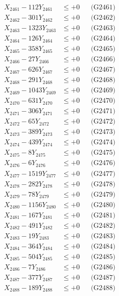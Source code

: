 \documentclass[a4paper,10pt]{article}
\begin{document}
{\begin{align}
\allowbreak
X_{2461} - 112Y_{2461} &\leq +0 && \text{(G2461)} \\
X_{2462} - 301Y_{2462} &\leq +0 && \text{(G2462)} \\
X_{2463} - 1323Y_{2463} &\leq +0 && \text{(G2463)} \\
X_{2464} - 126Y_{2464} &\leq +0 && \text{(G2464)} \\
X_{2465} - 358Y_{2465} &\leq +0 && \text{(G2465)} \\
X_{2466} - 27Y_{2466} &\leq +0 && \text{(G2466)} \\
X_{2467} - 626Y_{2467} &\leq +0 && \text{(G2467)} \\
X_{2468} - 291Y_{2468} &\leq +0 && \text{(G2468)} \\
X_{2469} - 1043Y_{2469} &\leq +0 && \text{(G2469)} \\
X_{2470} - 631Y_{2470} &\leq +0 && \text{(G2470)} \\
\allowbreak
X_{2471} - 306Y_{2471} &\leq +0 && \text{(G2471)} \\
X_{2472} - 65Y_{2472} &\leq +0 && \text{(G2472)} \\
X_{2473} - 389Y_{2473} &\leq +0 && \text{(G2473)} \\
X_{2474} - 439Y_{2474} &\leq +0 && \text{(G2474)} \\
X_{2475} - 8Y_{2475} &\leq +0 && \text{(G2475)} \\
X_{2476} - 6Y_{2476} &\leq +0 && \text{(G2476)} \\
X_{2477} - 1519Y_{2477} &\leq +0 && \text{(G2477)} \\
X_{2478} - 282Y_{2478} &\leq +0 && \text{(G2478)} \\
X_{2479} - 78Y_{2479} &\leq +0 && \text{(G2479)} \\
X_{2480} - 1156Y_{2480} &\leq +0 && \text{(G2480)} \\
\allowbreak
X_{2481} - 167Y_{2481} &\leq +0 && \text{(G2481)} \\
X_{2482} - 491Y_{2482} &\leq +0 && \text{(G2482)} \\
X_{2483} - 19Y_{2483} &\leq +0 && \text{(G2483)} \\
X_{2484} - 364Y_{2484} &\leq +0 && \text{(G2484)} \\
X_{2485} - 504Y_{2485} &\leq +0 && \text{(G2485)} \\
X_{2486} - 7Y_{2486} &\leq +0 && \text{(G2486)} \\
X_{2487} - 377Y_{2487} &\leq +0 && \text{(G2487)} \\
X_{2488} - 189Y_{2488} &\leq +0 && \text{(G2488)} \\

\end{align}}
\end{document}
